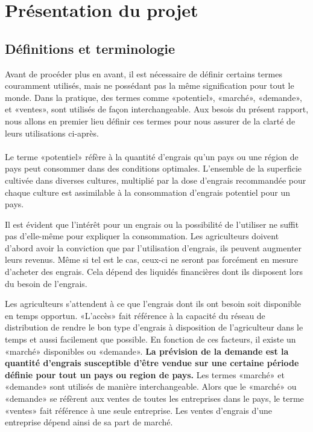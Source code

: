 \section{Présentation du projet}
	\subsection{Définitions et terminologie}
	Avant de procéder plus en avant, il est nécessaire de définir certains termes couramment utilisés, mais ne possédant pas la même signification pour tout le monde. Dans la pratique, des termes comme «potentiel», «marché», «demande», et «ventes», sont utilisés de façon interchangeable. Aux besois du présent rapport, nous allons en premier lieu définir ces termes pour nous assurer de la clarté de leurs utilisations ci-après.
	\paragraph*{}
	Le terme «potentiel»  réfère à la quantité d'engrais qu'un pays ou une région de pays peut consommer dans des conditions optimales. L'ensemble de la superficie cultivée dans diverses cultures, multiplié par la dose d'engrais recommandée pour chaque culture est assimilable à la consommation d'engrais potentiel pour un pays.\par
	Il est évident que l'intérêt pour un engrais ou la possibilité de l'utiliser ne suffit pas d'elle-même pour expliquer la consommation. Les agriculteurs doivent d'abord avoir la conviction que par l'utilisation d'engrais, ils peuvent augmenter leurs revenus. Même si tel est le cas, ceux-ci ne seront pas forcément en mesure d'acheter des engrais. Cela dépend des liquidés financières dont ils disposent lors du besoin de l'engrais.\par
	Les agriculteurs s'attendent à ce que l'engrais dont ils ont besoin soit disponible en temps opportun. «L'accès» fait référence à la capacité du réseau de distribution de rendre le bon type d'engrais à disposition de l'agriculteur dans le temps et aussi facilement que possible. En fonction de ces facteurs, il existe un «marché» disponibles ou «demande». \textbf{La prévision de la demande est la quantité d'engrais susceptible d'être vendue sur une certaine période définie pour tout un pays ou region de pays.} Les termes «marché» et «demande» sont utilisés de manière interchangeable. Alors que le «marché» ou «demande» se réfèrent aux ventes de toutes les entreprises dans le pays, le terme «ventes» fait référence à une seule entreprise. Les ventes d'engrais d'une entreprise dépend ainsi de sa part de marché.
